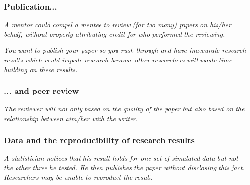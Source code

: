 \documentclass{beamer}
\begin{document}
\begin{frame} %

\frametitle{Publication... }

{  \it A  mentor  could  compel  a  mentee  to  review  (far  too  many)  papers  on  his/her behalf, without properly attributing credit for who performed the reviewing.}

\medskip

  {\it You  want  to  publish  your  paper  so  you  rush  through  and  have inaccurate research results which could impede research because other researchers will waste time building on these results.}

\end{frame}
\begin{frame}
\frametitle{ ... and peer review}

\medskip

  {\it The reviewer will not only based on the quality of the paper but also based on the relationship between him/her with the writer.}

  



\end{frame}





\begin{frame} %
\frametitle{  Data and the reproducibility of research results}

{\it A statistician notices that his result holds for one set of simulated data but not the  other  three  he  tested.   He  then  publishes  the  paper  without  disclosing  this fact.  Researchers may be unable to reproduct the result.}
  




\end{frame}
\end{document}

